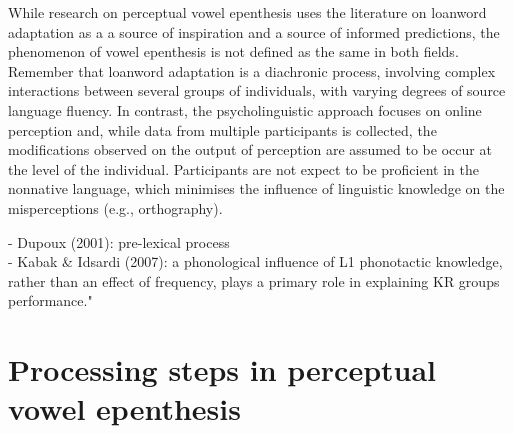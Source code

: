 While research on perceptual vowel epenthesis uses the literature on loanword adaptation as a a source of inspiration and a source of informed predictions, the phenomenon of vowel epenthesis is not defined as the same in both fields. Remember that loanword adaptation is a diachronic process, involving complex interactions between several groups of individuals, with varying degrees of source language fluency. 
In contrast, the psycholinguistic approach focuses on online perception and, while data from multiple participants is collected, the modifications observed on the output of perception are assumed to be occur at the level of the individual. Participants are not expect to be proficient in the nonnative language, which minimises the influence of linguistic knowledge on the misperceptions (e.g., orthography). 

    - Dupoux (2001): pre-lexical process \\
    - Kabak \& Idsardi (2007): a phonological influence of L1 phonotactic knowledge, rather than an effect of frequency, plays a primary role in explaining KR groups performance."




\section{Processing steps in perceptual vowel epenthesis}

